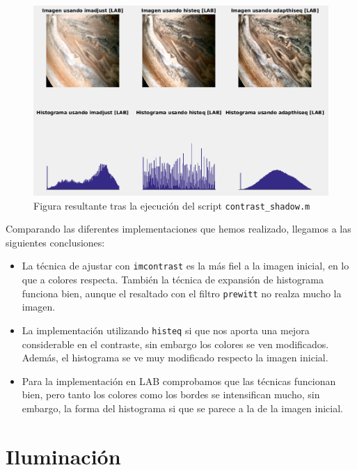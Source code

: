 \documentclass[12pt]{article}
\begin{document}
	\begin{figure}[h]
		\begin{center}
			\includegraphics[width=1\textwidth]{img/contrast_shadow.png}
			\caption{Figura resultante tras la ejecución del script \texttt{contrast\_shadow.m}}
			\label{img: contrast shadow}
		\end{center}
	\end{figure}
	
	
	\pagebreak
	
	\noindent Comparando las diferentes implementaciones que hemos realizado, llegamos a las siguientes conclusiones:
	\begin{itemize}
		\item La técnica de ajustar con \texttt{imcontrast} es la más fiel a la imagen inicial, en lo que a colores respecta. También la técnica de expansión de histograma funciona bien, aunque el resaltado con el filtro \texttt{prewitt} no realza mucho la imagen.
		\item La implementación utilizando \texttt{histeq} si que nos aporta una mejora considerable en el contraste, sin embargo los colores se ven modificados. Además, el histograma se ve muy modificado respecto la imagen inicial.
		\item Para la implementación en LAB comprobamos que las técnicas funcionan bien, pero tanto los colores como los bordes se intensifican mucho, sin embargo, la forma del histograma si que se parece a la de la imagen inicial.
	\end{itemize}
	
	\pagebreak
	
	\section{Iluminación}
	
\end{document}
